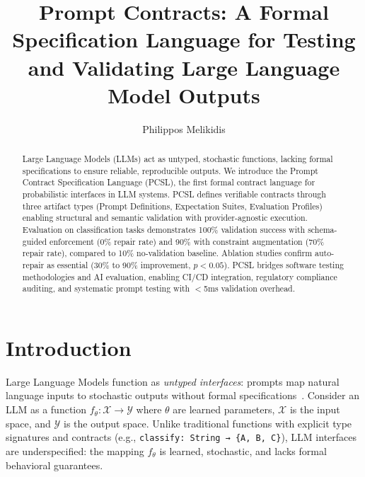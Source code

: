 \documentclass[sigconf]{acmart}
\begin{document}
\title{Prompt Contracts: A Formal Specification Language for Testing and Validating Large Language Model Outputs}

\author{Philippos Melikidis}

\begin{abstract}
Large Language Models (LLMs) act as untyped, stochastic functions, lacking formal specifications to ensure reliable, reproducible outputs. We introduce the Prompt Contract Specification Language (PCSL), the first formal contract language for probabilistic interfaces in LLM systems. PCSL defines verifiable contracts through three artifact types (Prompt Definitions, Expectation Suites, Evaluation Profiles) enabling structural and semantic validation with provider-agnostic execution. Evaluation on classification tasks demonstrates 100\% validation success with schema-guided enforcement (0\% repair rate) and 90\% with constraint augmentation (70\% repair rate), compared to 10\% no-validation baseline. Ablation studies confirm auto-repair as essential (30\% to 90\% improvement, \(p < 0.05\)). PCSL bridges software testing methodologies and AI evaluation, enabling CI/CD integration, regulatory compliance auditing, and systematic prompt testing with \(<\)5ms validation overhead.
\end{abstract}


\maketitle

\section{Introduction}

Large Language Models function as \textit{untyped interfaces}: prompts map natural language inputs to stochastic outputs without formal specifications~\cite{bender2021stochasticparrots}. Consider an LLM as a function \( f_\theta: \mathcal{X} \to \mathcal{Y} \) where \( \theta \) are learned parameters, \( \mathcal{X} \) is the input space, and \( \mathcal{Y} \) is the output space. Unlike traditional functions with explicit type signatures and contracts (e.g., \texttt{classify: String → \{A, B, C\}}), LLM interfaces are underspecified: the mapping \( f_\theta \) is learned, stochastic, and lacks formal behavioral guarantees.
\end{document}
